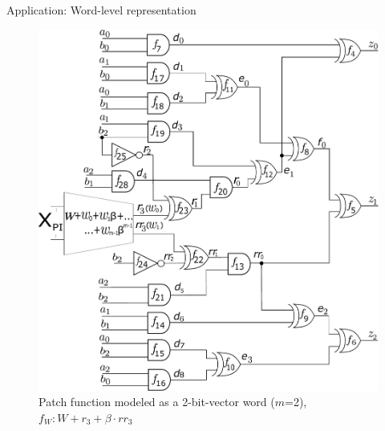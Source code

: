 \begin{frame}{\large Application: Word-level representation}
\begin{figure}[hbt]
\centering
    \includegraphics[scale = 0.24]{mas_3_ddc_mfr_b.pdf}
    \caption*{
    Patch function modeled as a 2-bit-vector word ($m$=2), 
    $f_W: W+ r_3 + \beta \cdot rr_3$}
    \label{fig:mas_bug_Wb}
\end{figure}
\end{frame}




